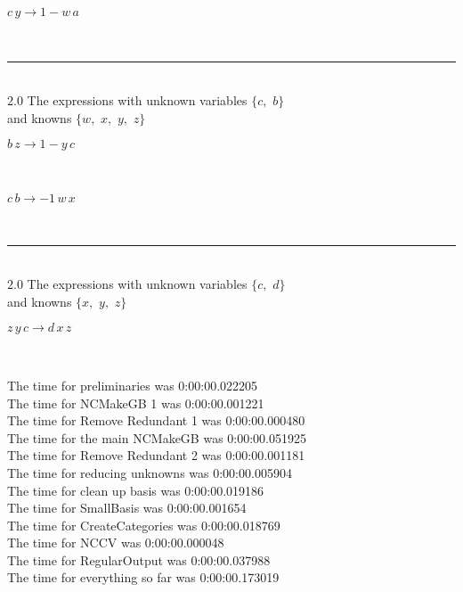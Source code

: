 \documentclass[rep10,leqno]{report}
\begin{document}
\begin{minipage}{6in}
$
c\,
 y\rightarrow 1 - w\,
 a
$
\end{minipage}\\
\rule[3pt]{6in}{.7pt}\\
$2.0$  The expressions with unknown variables $\{c,
$ $
b\}$\\
and knowns $\{w,
$ $
x,
$ $
y,
$ $
z\}$\smallskip\\
\begin{minipage}{6in}
$
b\,
 z\rightarrow 1 - y\,
 c
$
\end{minipage}\medskip \\
\begin{minipage}{6in}
$
c\,
 b\rightarrow -1\,
 w\,
 x
$
\end{minipage}\\
\rule[3pt]{6in}{.7pt}\\
$2.0$  The expressions with unknown variables $\{c,
$ $
d\}$\\
and knowns $\{x,
$ $
y,
$ $
z\}$\smallskip\\
\begin{minipage}{6in}
$
z\,
 y\,
 c\rightarrow d\,
 x\,
 z
$
\end{minipage}\\
\vspace{10pt}

\noindent
The time for preliminaries was 0:00:00.022205\\
The time for NCMakeGB 1 was 0:00:00.001221\\
The time for Remove Redundant 1 was 0:00:00.000480\\
The time for the main NCMakeGB was 0:00:00.051925\\
The time for Remove Redundant 2 was 0:00:00.001181\\
The time for reducing unknowns was 0:00:00.005904\\
The time for clean up basis was 0:00:00.019186\\
The time for SmallBasis was 0:00:00.001654\\
The time for CreateCategories was 0:00:00.018769\\
The time for NCCV was 0:00:00.000048\\
The time for RegularOutput was 0:00:00.037988\\
The time for everything so far was 0:00:00.173019\\
\end{document}
